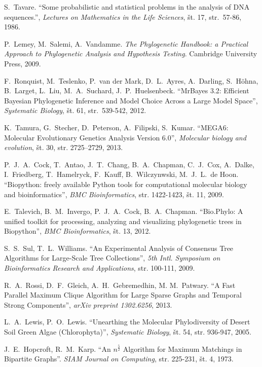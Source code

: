 \documentclass[a4paper, 12pt]{book}
\begin{document}
\begin{thebibliography}{99}
S.\ Tavare. 
``Some probabilistic and statistical problems in the analysis of DNA sequences.'', 
{\it Lectures on Mathematics in the Life Sciences}, št. 17, str.\ 57-86,  1986.

P.\ Lemey, M.\ Salemi, A.\ Vandamme. 
{\it The Phylogenetic Handbook: a Practical Approach to Phylogenetic Analysis 
and Hypothesis Testing}. 
Cambridge University Press, 2009.

F.\ Ronquist, M.\ Teslenko, P.\ van der Mark, D.\ L.\ Ayres, A.\ Darling, 
S.\ Höhna, B.\ Larget, L.\ Liu, M.\ A.\ Suchard, J.\ P.\ Huelsenbeck. 
``MrBayes 3.2: Efficient Bayesian Phylogenetic Inference and Model 
Choice Across a Large Model Space'', 
{\it Systematic Biology}, 
št. 61, str.\ 539-542, 2012.

K.\ Tamura, G.\ Stecher, D.\ Peterson, A.\ Filipski, S.\ Kumar. 
``MEGA6: Molecular Evolutionary Genetics Analysis Version 6.0'', 
{\it Molecular biology and evolution}, 
št. 30, str. 2725–2729, 2013.

P.\ J.\ A.\ Cock, T.\ Antao, J.\ T.\ Chang, B.\ A.\ Chapman, 
C.\ J.\ Cox, A.\ Dalke, I.\ Friedberg, T.\ Hamelryck, 
F.\ Kauff, B.\ Wilczynwski, M.\ J.\ L.\ de Hoon.
``Biopython: freely available Python tools for computational 
molecular biology and bioinformatics'', 
{\it BMC Bioinformatics}, 
str. 1422-1423, št. 11, 2009.

E.\ Talevich, B.\ M.\ Invergo, P.\ J.\ A.\ Cock, B.\ A.\ Chapman.
``Bio.Phylo: A unified toolkit for processing, analyzing and 
visualizing phylogenetic trees in Biopython'', 
{\it BMC Bioinformatics}, 
št. 13, 2012.

S.\ S.\ Sul, T.\ L.\ Williams. 
``An Experimental Analysis of Consensus Tree Algorithms for 
Large-Scale Tree Collections'', 
{\it 5th Intl. Symposium on Bioinformatics Research and Applications}, 
str. 100-111, 2009.

R.\ A.\ Rossi, D.\ F.\ Gleich, A.\ H.\ Gebremedhin, M. M.\ Patwary.  
``A Fast Parallel Maximum Clique Algorithm for Large Sparse Graphs 
and Temporal Strong Components'', 
{\it arXiv preprint 1302.6256}, 2013.  

L.\ A.\ Lewis, P.\ O.\ Lewis. 
``Unearthing the Molecular Phylodiversity of Desert Soil Green Algae (Chlorophyta)'', 
{\it Systematic Biology}, 
št. 54, str. 936-947, 2005.

J.\ E.\ Hopcroft, R.\ M.\ Karp. 
``An $n^{\frac{5}{2}}$ Algorithm for Maximum Matchings in Bipartite Graphs''. 
{\it SIAM Journal on Computing}, 
str. 225-231, št. 4, 1973.


\end{thebibliography}
\end{document}
